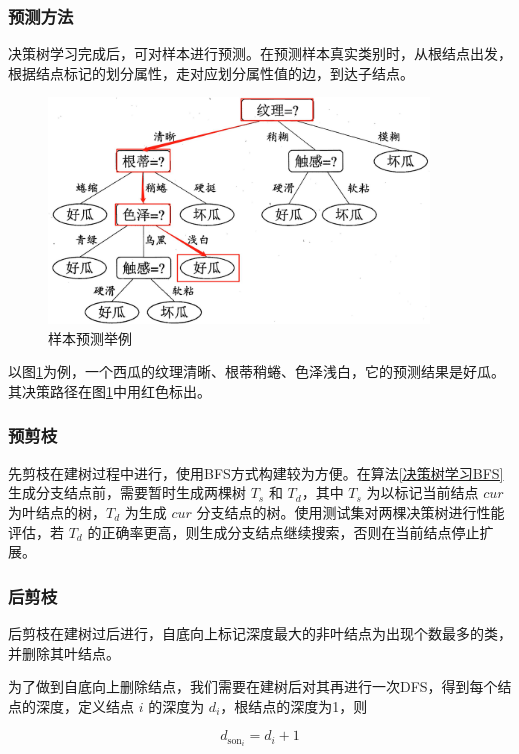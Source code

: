 \documentclass{ctexart}
\begin{document}
	\subsubsection{预测方法}
	
	决策树学习完成后，可对样本进行预测。在预测样本真实类别时，从根结点出发，根据结点标记的划分属性，走对应划分属性值的边，到达子结点。
	
	\begin{figure}[!htb]
		\centering
		\includegraphics[scale=1,height=6cm]{../image/预测结果举例.jpg}
		\caption{样本预测举例}
		\label{样本预测举例}
	\end{figure}

	以图\ref{样本预测举例}为例，一个西瓜的纹理清晰、根蒂稍蜷、色泽浅白，它的预测结果是好瓜。其决策路径在图\ref{样本预测举例}中用红色标出。
	
	\subsubsection{预剪枝}
	
	先剪枝在建树过程中进行，使用BFS方式构建较为方便。在算法\ref{决策树学习BFS}生成分支结点前，需要暂时生成两棵树 $T_s$ 和 $T_d$，其中 $T_s$ 为以标记当前结点 $cur$ 为叶结点的树，$T_d$ 为生成 $cur$ 分支结点的树。使用测试集对两棵决策树进行性能评估，若 $T_d$ 的正确率更高，则生成分支结点继续搜索，否则在当前结点停止扩展。 
	
	\subsubsection{后剪枝}
	
	后剪枝在建树过后进行，自底向上标记深度最大的非叶结点为出现个数最多的类，并删除其叶结点。
	
	为了做到自底向上删除结点，我们需要在建树后对其再进行一次DFS，得到每个结点的深度，定义结点 $i$ 的深度为 $d_i$，根结点的深度为1，则
	
	\begin{equation}
		d_{\text{son}_i}=d_i+1
	\end{equation}
\end{document}

